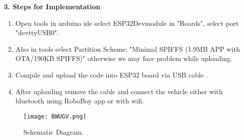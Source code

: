\documentclass[12pt]{article}
\begin{document}
\begin{multicols}{2}
\vspace{1em}
\noindent\textbf{3. Steps for Implementation}
\begin{enumerate}
    \item Open tools in arduino ide select ESP32Devmodule in "Boards", select port "devttyUSB0".
    \item Also in tools select Partition Scheme: "Minimal SPIFFS (1.9MB APP with OTA/190KB SPIFFS)" otherwise we may face problem while uploading.
    \item Compile and upload the code into ESP32 board via USB cable .
    \item After uploading remove the cable and connect the vehicle either with bluetooth using RoboBoy app or with wifi.
\end{enumerate}

\vspace{1em}

\end{multicols}
\vspace{4em}
\vspace{1em}
\begin{multicols}{2}
\begin{figure}[H]
    \centering
    \texttt{[image: BWUGV.png]}
    \caption{Schematic Diagram.}
    \label{fig:image1}
\end{figure}

\end{multicols}
\end{document}

